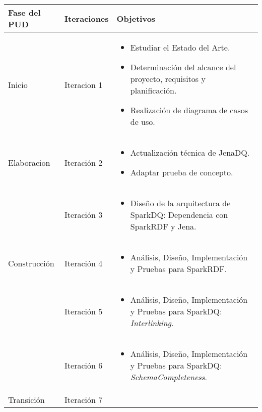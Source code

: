 \vspace{1cm}
\begin{tabular}{|p{}|p{}|p{}|}

\hline

\cellcolor[gray]{0.7}Fase del \acs{PUD} &
\cellcolor[gray]{0.7}Iteraciones &
\cellcolor[gray]{0.7}Objetivos \\
\hline
Inicio & Iteracion 1 &

\begin{itemize}
\item Estudiar el Estado del Arte.
\item Determinación del alcance del proyecto, requisitos y planificación.
\item Realización de diagrama de casos de uso.
\end{itemize}

\\
\hline

Elaboracion & Iteración 2 &

\begin{itemize}

\item Actualización técnica de JenaDQ.
\item Adaptar prueba de concepto.
\end{itemize}

\\
& Iteración 3 &


\begin{itemize}
\item Diseño de la arquitectura de SparkDQ: Dependencia con SparkRDF y Jena.
\end{itemize}
\\
\hline


Construcción & Iteración 4 &


\begin{itemize}
\item Análisis, Diseño, Implementación y Pruebas para SparkRDF.
\end{itemize}
\\
& Iteración 5 &

\begin{itemize}
\item Análisis, Diseño, Implementación y Pruebas para SparkDQ: \textit{Interlinking}.
\end{itemize}
\\
& Iteración 6 &

\begin{itemize}
\item Análisis, Diseño, Implementación y Pruebas para SparkDQ: \textit{SchemaCompleteness}.
\end{itemize}
\\
\hline
Transición & Iteración 7 &


\end{tabular}
